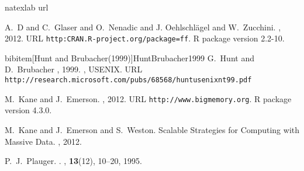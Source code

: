 \begin{thebibliography}{1}
\expandafter\ifx\csname natexlab\endcsname\relax\def\natexlab#1{#1}\fi
\expandafter\ifx\csname url\endcsname\relax
  \def\url#1{{\tt #1}}\fi

A.~D and C.~Glaser and O.~Nenadic and J. Oehlschl\"agel and W.~Zucchini.
, 2012.
\newblock URL \url{http:CRAN.R-project.org/package=ff}.
\newblock R package version 2.2-10.

bibitem[Hunt and Brubacher(1999)]{HuntBrubacher1999}
G.~Hunt and D.~Brubacher
, 1999.
, USENIX.
\newblock URL \url{http://research.microsoft.com/pubs/68568/huntusenixnt99.pdf}


M.~Kane and J.~Emerson.
, 2012.
\newblock URL \url{http://www.bigmemory.org}.
\newblock R package version 4.3.0.

M.~Kane and J.~Emerson and S.~Weston.
\newblock Scalable Strategies for Computing with Massive Data.
, 2012.

P.~J.~Plauger.
.
, {\bf 13}(12), 10--20, 1995.

\end{thebibliography}

\address{Michael Kane\\
  Yale University\\
  300 George Street\\
  Suite 555\\
  New Haven, CT 06511\\
  USA}\\

\address{Bryan Lewis\\
  Paradigm4\\
  Address\\
  Country}\\


